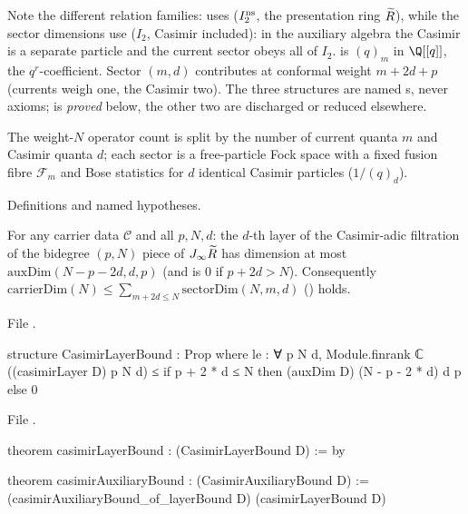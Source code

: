 \begin{dictionary}
Note the different relation families:  uses  ($I_2^{\mathrm{ns}}$, the presentation ring
$\widetilde R$), while the sector dimensions use  ($I_2$, Casimir included): in the auxiliary
algebra the Casimir is a separate particle and the current sector obeys all of $I_2$.  is
$(q)_m$ in $\Q[[q]]$,  the $q^r$-coefficient. Sector $(m,d)$ contributes at conformal weight
$m+2d+p$ (currents weigh one, the Casimir two). The three structures are named s, never axioms;
 is \emph{proved} below, the other two are discharged or reduced elsewhere.
\end{dictionary}

\begin{physics}
The weight-$N$ operator count is split by the number of current quanta $m$ and Casimir quanta $d$; each
sector is a free-particle Fock space with a fixed fusion fibre $\mathcal F_m$ and Bose statistics for $d$ identical
Casimir particles ($1/(q)_d$).
\end{physics}

\begin{status}
Definitions and named hypotheses.
\end{status}

\begin{theorem}\label{l24:thm:B1}
For any carrier data $\mathscr C$ and all $p,N,d$: the $d$-th layer of the Casimir-adic filtration of the bidegree
$(p,N)$ piece of $J_\infty\widetilde R$ has dimension at most $\mathrm{auxDim}(N-p-2d,d,p)$ (and is $0$ if $p+2d>N$).
Consequently $\mathrm{carrierDim}(N)\le\sum_{m+2d\le N}\mathrm{sectorDim}(N,m,d)$ () holds.
\end{theorem}
\noindent File .
\begin{leancode}
structure CasimirLayerBound : Prop where
  le : ∀ p N d, Module.finrank ℂ ((casimirLayer D) p N d) ≤
    if p + 2 * d ≤ N then (auxDim D) (N - p - 2 * d) d p else 0
\end{leancode}
\noindent File .
\begin{leancode}
theorem casimirLayerBound : (CasimirLayerBound D) := by

theorem casimirAuxiliaryBound : (CasimirAuxiliaryBound D) :=
  (casimirAuxiliaryBound_of_layerBound D) (casimirLayerBound D)
\end{leancode}

